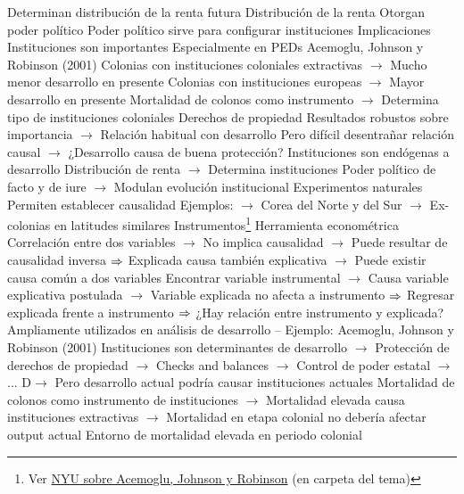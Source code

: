 \documentclass{nuevotema}
\begin{document}
\begin{esquemal}
				\4[] Determinan distribución de la renta futura
				\4 Distribución de la renta
				\4[] Otorgan poder político
				\4[] Poder político sirve para configurar instituciones
			\3 Implicaciones
				\4 Instituciones son importantes
				\4[] Especialmente en PEDs
				\4 Acemoglu, Johnson y Robinson (2001)
				\4[] Colonias con instituciones coloniales extractivas
				\4[] $\to$ Mucho menor desarrollo en presente
				\4[] Colonias con instituciones europeas
				\4[] $\to$ Mayor desarrollo en presente
				\4[] Mortalidad de colonos como instrumento
				\4[] $\to$ Determina tipo de instituciones coloniales
				\4 Derechos de propiedad
				\4[] Resultados robustos sobre importancia
				\4[] $\to$ Relación habitual con desarrollo
				\4[] Pero difícil desentrañar relación causal
				\4[] $\to$ ¿Desarrollo causa de buena protección?
				\4 Instituciones son endógenas a desarrollo
				\4[] Distribución de renta
				\4[] $\to$ Determina instituciones
				\4[] Poder político de facto y de iure
				\4[] $\to$ Modulan evolución institucional
				\4 Experimentos naturales
				\4[] Permiten establecer causalidad
				\4[] Ejemplos:
				\4[] $\to$ Corea del Norte y del Sur
				\4[] $\to$ Ex-colonias en latitudes similares
				\4 Instrumentos\footnote{Ver \href{http://www.econ.nyu.edu/user/benhabib/Acemoglu-Johnson-Robinson3.pdf}{NYU sobre Acemoglu, Johnson y Robinson} (en carpeta del tema)}
				\4[] Herramienta econométrica
				\4[] Correlación entre dos variables
				\4[] $\to$ No implica causalidad
				\4[] $\to$ Puede resultar de causalidad inversa
				\4[] $\Rightarrow$ Explicada causa también explicativa
				\4[] $\to$ Puede existir causa común a dos variables
				\4[] Encontrar variable instrumental
				\4[] $\to$ Causa variable explicativa postulada
				\4[] $\to$ Variable explicada no afecta a instrumento
				\4[] $\Rightarrow$ Regresar explicada frente a instrumento
				\4[] $\Rightarrow$ ¿Hay relación entre instrumento y explicada?
				\4[] Ampliamente utilizados en análisis de desarrollo
				\4[] -- Ejemplo: Acemoglu, Johnson y Robinson (2001)
				\4[] Instituciones son determinantes de desarrollo
				\4[] $\to$ Protección de derechos de propiedad
				\4[] $\to$ Checks and balances
				\4[] $\to$ Control de poder estatal
				\4[] $\to$ ...
				\4[] D$\to$ Pero desarrollo actual podría causar instituciones actuales
				\4[] Mortalidad de colonos como instrumento de instituciones
				\4[] $\to$ Mortalidad elevada causa instituciones extractivas
				\4[] $\to$ Mortalidad en etapa colonial no debería afectar output actual
				\4[] Entorno de mortalidad elevada en periodo colonial

\end{esquemal}
\end{document}
